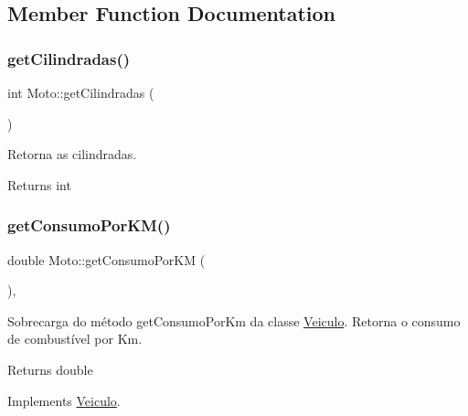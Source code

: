 \subsection{Member Function Documentation}
\mbox{\label{classMoto_a2161224a091483389bbd25323b7f25e1}} 
\subsubsection{\texorpdfstring{get\+Cilindradas()}{getCilindradas()}}
{\footnotesize\ttfamily int Moto\+::get\+Cilindradas (\begin{DoxyParamCaption}{ }\end{DoxyParamCaption})}



Retorna as cilindradas. 

\begin{DoxyReturn}{Returns}
int 
\end{DoxyReturn}
\mbox{\label{classMoto_ab352f37ae3e8f056f177ea64723dabf9}} 
\subsubsection{\texorpdfstring{get\+Consumo\+Por\+K\+M()}{getConsumoPorKM()}}
{\footnotesize\ttfamily double Moto\+::get\+Consumo\+Por\+KM (\begin{DoxyParamCaption}{ }\end{DoxyParamCaption})\hspace{0.3cm}{\ttfamily [override]}, {\ttfamily [virtual]}}



Sobrecarga do método get\+Consumo\+Por\+Km da classe \hyperlink{classVeiculo}{Veiculo}. Retorna o consumo de combustível por Km. 

\begin{DoxyReturn}{Returns}
double 
\end{DoxyReturn}


Implements \hyperlink{classVeiculo}{Veiculo}.

\mbox{\label{classMoto_a5d51c4a754d495c84ec9b7abf5a243e0}} 
